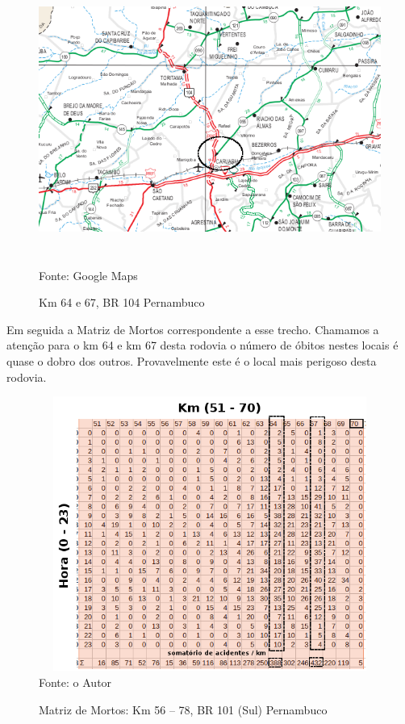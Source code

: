 \pagebreak


\begin{figure}[htbp!]
	\centering
	\caption{Km 64 e 67, BR 104 Pernambuco}
	\label{fig:Km70BR101}
	\includegraphics[width=150mm, height=95mm]{Figuras/Resultados/CaruaruRegiao}\\
	\tiny Fonte: Google Maps
\end{figure}

\vspace{7mm}

Em seguida a Matriz de Mortos correspondente a esse trecho. Chamamos a atenção para o km 64 e km 67 desta rodovia o número de óbitos nestes locais é quase o dobro dos outros. Provavelmente este é o local mais perigoso desta rodovia.

\begin{figure}[htbp!]
	\centering
	\caption{Matriz de Mortos: Km 56 -- 78, BR 101 (Sul) Pernambuco}
	\label{fig:MatrizMortos2d-101}
	\includegraphics[width=120mm, height=90mm]{Figuras/Resultados/MM2d104}\\
	\tiny Fonte: o Autor
\end{figure}


